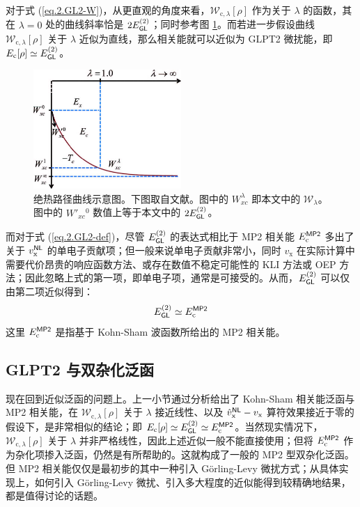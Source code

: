 对于式 (\ref{eq.2.GL2-W})，从更直观的角度来看，$\mathcal{W}_{\mathrm{c}, \lambda} [\rho]$ 作为关于 $\lambda$ 的函数，其在 $\lambda = 0$ 处的曲线斜率恰是 $2 E_{\textsf{GL}}^{(2)}$；同时参考图 \ref{fig.2.adiabatic-curve}。而若进一步假设曲线 $\mathcal{W}_{\mathrm{c}, \lambda} [\rho]$ 关于 $\lambda$ 近似为直线，那么相关能就可以近似为 GLPT2 微扰能，即 $E_\mathrm{c} [\rho] \simeq E_{\textsf{GL}}^{(2)}$。

\begin{figure}[h]
  \centering
  \includegraphics[width=0.5\textwidth]{assets/adiabatic-curve.jpg}
  \caption{绝热路径曲线示意图。下图取自文献\cite{Su-Xu.JCP.2014}。图中的 $W_{xc}^{\lambda}$ 即本文中的 $\mathcal{W}_{\lambda}$。图中的 $W'_{xc}{}^{0}$ 数值上等于本文中的 $2 E_{\textsf{GL}}^{(2)}$。}
  \label{fig.2.adiabatic-curve}
\end{figure}

而对于式 (\ref{eq.2.GL2-def})，尽管 $E_{\textsf{GL}}^{(2)}$ 的表达式相比于 MP2 相关能 $E_\mathrm{c}^{\textsf{MP2}}$ 多出了关于 $v_\mathrm{x}^{\textsf{NL}}$ 的单电子贡献项；但一般来说单电子贡献非常小\cite{DellaSala-Goerling.JCP.2001}，同时 $v_\mathrm{x}$ 在实际计算中需要代价昂贵的响应函数方法\cite{Goerling-Goerling.PRL.1999}、或存在数值不稳定可能性的 KLI 方法\cite{Krieger-Iafrate.PRA.1992, DellaSala-Goerling.JCP.2001}或 OEP 方法\cite{Mori-Sanchez-Yang.JCP.2005}；因此忽略上式的第一项，即单电子项，通常是可接受的。从而，$E_{\textsf{GL}}^{(2)}$ 可以仅由第二项近似得到：
\begin{equation}
  E_{\textsf{GL}}^{(2)} \simeq E_\mathrm{c}^{\textsf{MP2}}
\end{equation}
这里 $E_\mathrm{c}^{\textsf{MP2}}$ 是指基于 Kohn-Sham 波函数所给出的 MP2 相关能。

\subsection{GLPT2 与双杂化泛函}
\label{sec.2.glpt2-dh}

现在回到近似泛函的问题上。上一小节通过分析给出了 Kohn-Sham 相关能泛函与 MP2 相关能，在 $\mathcal{W}_{\mathrm{c}, \lambda} [\rho]$ 关于 $\lambda$ 接近线性、以及 $\hat v_\mathrm{x}^{\textsf{NL}} - v_\mathrm{x}$ 算符效果接近于零的假设下，是非常相似的结论；即 $E_\mathrm{c} [\rho] \simeq E_{\textsf{GL}}^{(2)} \simeq E_\mathrm{c}^{\textsf{MP2}}$。当然现实情况下，$\mathcal{W}_{\mathrm{c}, \lambda} [\rho]$ 关于 $\lambda$ 并非严格线性，因此上述近似一般不能直接使用；但将 $E_\mathrm{c}^{\textsf{MP2}}$ 作为杂化项掺入泛函，仍然是有所帮助的。这就构成了一般的 MP2 型双杂化泛函。但 MP2 相关能仅仅是最初步的其中一种引入 G\"orling-Levy 微扰方式；从具体实现上，如何引入 G\"orling-Levy 微扰、引入多大程度的近似能得到较精确地结果，都是值得讨论的话题。

